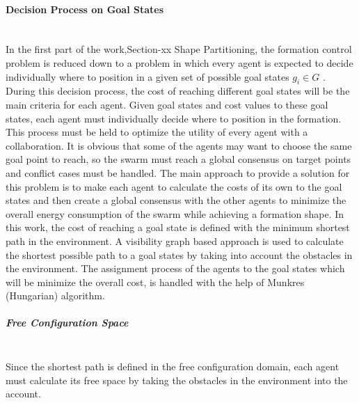 \documentclass[twoside]{article}
\begin{document}
		\paragraph{Decision Process on Goal States}\hspace{0pt} \\
	In the first part of the work,Section-xx Shape Partitioning, the formation control problem is reduced down to a problem in which every agent is expected to decide individually where to position in a given set of possible goal states $g_i \in G$ .  During this decision process, the cost of reaching different goal states will be the main criteria for each agent. Given goal states and cost values to these goal states, each agent must individually  decide where to position in the formation. This process must be held to optimize the utility of every agent with a collaboration. It is obvious that some of the agents may want to choose the same goal point to reach, so the swarm must reach a global consensus on target points and conflict cases must be handled. The main approach to provide a solution for this problem is to make each agent to calculate the costs of its own to the goal states and then create a global consensus with the other agents to minimize the overall energy consumption of the swarm while achieving a formation shape. 
	In this work, the cost of reaching a goal state is defined with the minimum shortest path in the environment. A visibility graph based approach is used to calculate the shortest possible path to a goal states by taking into account the obstacles in the environment. The assignment process of the agents to the goal states which will be minimize the overall cost, is handled with the help of Munkres (Hungarian)  algorithm.
	
	\subparagraph{Free Configuration Space}\hspace{0pt} \\
		Since the shortest path is defined in the free configuration domain, each agent must calculate its free space by taking the obstacles in the environment into the account. 
\end{document}

